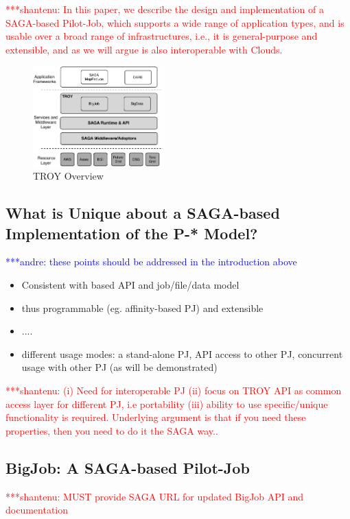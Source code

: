 \documentclass[conference,final]{IEEEtran}
\newcommand{\jhanote}[1]{ {\textcolor{red} { ***shantenu: #1 }}}
\newcommand{\alnote}[1]{ {\textcolor{blue} { ***andre: #1 }}}
\newcommand{\alnote}[1]{}
\newcommand{\jhanote}[1]{}
\begin{document}
\jhanote{In this paper, we describe the design and implementation of a
  SAGA-based Pilot-Job, which supports a wide range of application
  types, and is usable over a broad range of infrastructures, i.e., it
  is general-purpose and extensible, and as we will argue is also
  interoperable with Clouds.}
 

\begin{figure}[htbp]
	\centering
		\includegraphics[width=0.45\textwidth]{figures/troy.pdf}
	\caption{TROY Overview}
	\label{fig:figures_troy}
\end{figure}


\subsection{What is Unique about a SAGA-based Implementation of the
  P-* Model?}
\alnote{these points should be addressed in the introduction above}
\begin{itemize}
\item Consistent with based API and job/file/data model
\item thus programmable (eg. affinity-based PJ) and extensible 
\item ....
\item different usage modes: a stand-alone PJ, API access to other PJ,
  concurrent usage with other PJ (as will be demonstrated)
\end{itemize}


\jhanote{(i) Need for interoperable PJ (ii) focus on TROY API as
  common access layer for different PJ, i.e portability (iii) ability
  to use specific/unique functionality is required. Underlying
  argument is that if you need these properties, then you need to do
  it the SAGA way..}

\subsection{BigJob: A SAGA-based Pilot-Job}

\jhanote{MUST provide SAGA URL for updated BigJob API and
  documentation}
\end{document}
